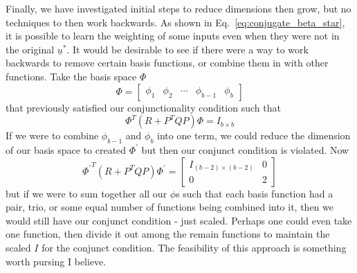 Finally, we have investigated initial steps to reduce dimensions then grow, but no techniques to then work backwards. As shown in Eq.~\ref{eq:conjugate_beta_star}, it is possible to learn the weighting of some inputs even when they were not in the original $\underline{u}^\ast$. It would be desirable to see if there were a way to work backwards to remove certain basis functions, or combine them in with other functions. Take the basis space $\Phi$
\begin{equation}
    \Phi = 
    \begin{bmatrix}
        \phi_1 & \phi_2 & \cdots & \phi_{b-1} & \phi_{b}
    \end{bmatrix}
\end{equation}
that previously satisfied our conjunctionality condition such that
\begin{equation}
    \Phi^T (R + P^T Q P) \Phi = I_{b \times b}
\end{equation}
If we were to combine $\phi_{b-1}$ and $\phi_{b}$ into one term, we could reduce the dimension of our basis space to created $\Phi^\prime$ but then our conjunct condition is violated. Now
\begin{equation}
    {\Phi^\prime}^T (R + P^T Q P) \Phi^\prime 
    = 
    \begin{bmatrix}
        I_{(b-2) \times (b-2)} & 0 \\
        0 & 2
    \end{bmatrix}
\end{equation}
but if we were to sum together all our $\phi$s such that each basis function had a pair, trio, or some equal number of functions being combined into it, then we would still have our conjunct condition - just scaled. Perhaps one could even take one function, then divide it out among the remain functions to maintain the scaled $I$ for the conjunct condition. The feasibility of this approach is something worth pursing I believe.
